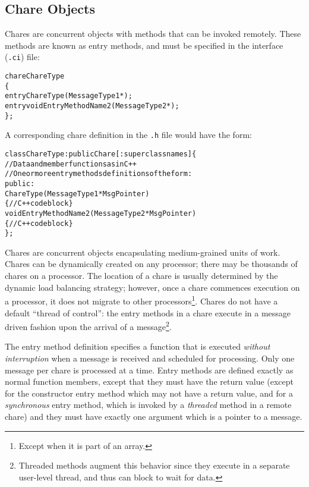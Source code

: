 \subsection{Chare Objects}

Chares are concurrent objects with methods that can be invoked
remotely.  These methods are known as entry methods, and 
must be specified in the interface (\texttt{.ci}) file:

\begin{alltt}
chare ChareType
\{
    entry   ChareType             (MessageType1 *);
    entry   void EntryMethodName2 (MessageType2 *);
\};
\end{alltt}

A corresponding chare definition in the \texttt{.h} file would 
have the form:

\begin{alltt}
   class ChareType : public Chare [: superclass names] \{   
        // Data and member functions as in C++ 
        // One or more entry methods definitions of the form: 
   public: 
      ChareType(MessageType1 *MsgPointer) 
         \{ // C++ code block  \} 
      void EntryMethodName2(MessageType2 *MsgPointer) 
         \{ // C++ code block  \} 
   \};
\end{alltt}

Chares are concurrent objects encapsulating medium-grained units of
work.  Chares can be dynamically created on any processor; there may
be thousands of chares on a processor. The location of a chare is
usually determined by the dynamic load balancing strategy; however,
once a chare commences execution on a processor, it does not migrate
to other processors\footnote{Except when it is part of an array.}.  
Chares do not have a default ``thread of
control'': the entry methods  in a
chare execute in a message driven fashion upon the arrival of a 
message\footnote{Threaded methods augment this behavior since they execute in
a separate user-level thread, and thus can block to wait for data.}.

The entry method definition specifies a function that is executed {\em
without interruption} when a message is received and scheduled for
processing. Only one message per chare is processed at a time.  Entry
methods are defined exactly as normal \CC{} function members, except
that they must have the return value  (except for the
constructor entry method which may not have a return value, and for a 
{\em synchronous} entry method, which is invoked by a {\em threaded} 
method in a remote chare) and they
must have exactly one argument which is a pointer to a message.

